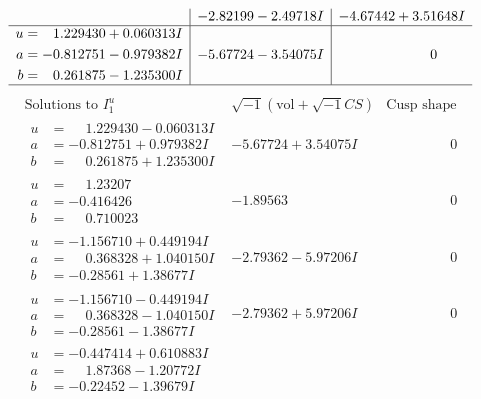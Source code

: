 \documentclass[1p]{elsarticle_modified}
\theoremstyle{definition}
\newcommand{\I}{\sqrt{-1}}
\begin{document}
$$\begin{array}{c|c|c}
 & -2.82199 - 2.49718 I & -4.67442 + 3.51648 I \\ \hline\begin{aligned}
u &= \phantom{-}1.229430 + 0.060313 I \\
a &= -0.812751 - 0.979382 I \\
b &= \phantom{-}0.261875 - 1.235300 I\end{aligned}
 & -5.67724 - 3.54075 I & \phantom{-0.000000 } 0\\
 \hline 
 \end{array}$$\newpage$$\begin{array}{c|c|c}  
\text{Solutions to }I^u_{1}& \I (\text{vol} + \sqrt{-1}CS) & \text{Cusp shape}\\
 \hline 
\begin{aligned}
u &= \phantom{-}1.229430 - 0.060313 I \\
a &= -0.812751 + 0.979382 I \\
b &= \phantom{-}0.261875 + 1.235300 I\end{aligned}
 & -5.67724 + 3.54075 I & \phantom{-0.000000 } 0 \\ \hline\begin{aligned}
u &= \phantom{-}1.23207\phantom{ +0.000000I} \\
a &= -0.416426\phantom{ +0.000000I} \\
b &= \phantom{-}0.710023\phantom{ +0.000000I}\end{aligned}
 & -1.89563\phantom{ +0.000000I} & \phantom{-0.000000 } 0 \\ \hline\begin{aligned}
u &= -1.156710 + 0.449194 I \\
a &= \phantom{-}0.368328 + 1.040150 I \\
b &= -0.28561 + 1.38677 I\end{aligned}
 & -2.79362 - 5.97206 I & \phantom{-0.000000 } 0 \\ \hline\begin{aligned}
u &= -1.156710 - 0.449194 I \\
a &= \phantom{-}0.368328 - 1.040150 I \\
b &= -0.28561 - 1.38677 I\end{aligned}
 & -2.79362 + 5.97206 I & \phantom{-0.000000 } 0 \\ \hline\begin{aligned}
u &= -0.447414 + 0.610883 I \\
a &= \phantom{-}1.87368 - 1.20772 I \\
b &= -0.22452 - 1.39679 I\end{aligned}

\end{array}$$
\end{document}
